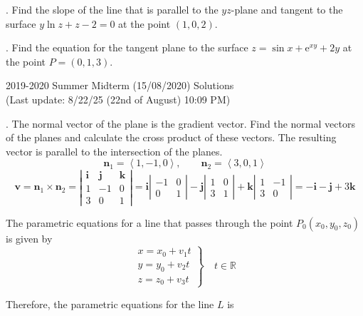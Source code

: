 \documentclass{article}
\begin{document}
\hfill

. Find the slope of the line that is parallel to the $yz$-plane and tangent to the surface $y\ln z+z-2=0$ at the point $(1,0,2)$.

\hfill

. Find the equation for the tangent plane to the surface $z=\sin x+\mathrm{e}^{xy}+2y$ at the point $P=(0,1,3)$.

\newpage

\begin{center}
2019-2020 Summer Midterm (15/08/2020) Solutions\\
(Last update: 8/22/25 (22nd of August) 10:09 PM)
\end{center}

. The normal vector of the plane is the gradient vector. Find the normal vectors of the planes and calculate the cross product of these vectors. The resulting vector is parallel to the intersection of the planes.
\[\mathbf{n}_1=\left\langle1,-1,0\right\rangle,\qquad \mathbf{n}_2=\left\langle3,0,1\right\rangle\]
\[\mathbf{v}=\mathbf{n}_1\times\mathbf{n}_2=\left|\begin{array}{ccc}
\mathbf{i}&\mathbf{j}&\mathbf{k}\\
1&-1&0\\
3&0&1
\end{array}\right|=\mathbf{i}\left|\begin{array}{cc}
-1&0\\0&1
\end{array}\right|-\mathbf{j}\left|\begin{array}{cc}
1&0\\3&1
\end{array}\right|+\mathbf{k}\left|\begin{array}{cc}
1&-1\\3&0
\end{array}\right|=-\mathbf{i}-\mathbf{j}+3\mathbf{k}\]

\hfill

\noindent The parametric equations for a line that passes through the point $P_0(x_0,y_0,z_0)$ is given by
\[\left.\begin{array}{c}
x=x_0+v_1t\\
y=y_0+v_2t\\
z=z_0+v_3t
\end{array}\right\}\quad t\in\mathbb{R}\]

\hfill

\noindent Therefore, the parametric equations for the line $L$ is
\end{document}
